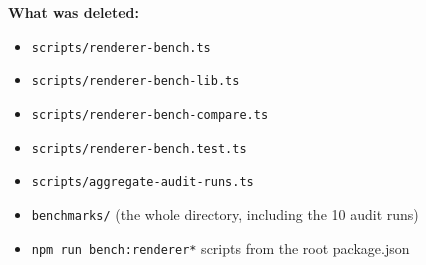 \textbf{What was deleted:}

\begin{itemize}
\tightlist
\item
  \texttt{s\allowbreak{}c\allowbreak{}r\allowbreak{}i\allowbreak{}p\allowbreak{}t\allowbreak{}s\allowbreak{}/\allowbreak{}r\allowbreak{}e\allowbreak{}n\allowbreak{}d\allowbreak{}e\allowbreak{}r\allowbreak{}e\allowbreak{}r\allowbreak{}-\allowbreak{}b\allowbreak{}e\allowbreak{}n\allowbreak{}c\allowbreak{}h\allowbreak{}.\allowbreak{}t\allowbreak{}s}
\item
  \texttt{s\allowbreak{}c\allowbreak{}r\allowbreak{}i\allowbreak{}p\allowbreak{}t\allowbreak{}s\allowbreak{}/\allowbreak{}r\allowbreak{}e\allowbreak{}n\allowbreak{}d\allowbreak{}e\allowbreak{}r\allowbreak{}e\allowbreak{}r\allowbreak{}-\allowbreak{}b\allowbreak{}e\allowbreak{}n\allowbreak{}c\allowbreak{}h\allowbreak{}-\allowbreak{}l\allowbreak{}i\allowbreak{}b\allowbreak{}.\allowbreak{}t\allowbreak{}s}
\item
  \texttt{s\allowbreak{}c\allowbreak{}r\allowbreak{}i\allowbreak{}p\allowbreak{}t\allowbreak{}s\allowbreak{}/\allowbreak{}r\allowbreak{}e\allowbreak{}n\allowbreak{}d\allowbreak{}e\allowbreak{}r\allowbreak{}e\allowbreak{}r\allowbreak{}-\allowbreak{}b\allowbreak{}e\allowbreak{}n\allowbreak{}c\allowbreak{}h\allowbreak{}-\allowbreak{}c\allowbreak{}o\allowbreak{}m\allowbreak{}p\allowbreak{}a\allowbreak{}r\allowbreak{}e\allowbreak{}.\allowbreak{}t\allowbreak{}s}
\item
  \texttt{s\allowbreak{}c\allowbreak{}r\allowbreak{}i\allowbreak{}p\allowbreak{}t\allowbreak{}s\allowbreak{}/\allowbreak{}r\allowbreak{}e\allowbreak{}n\allowbreak{}d\allowbreak{}e\allowbreak{}r\allowbreak{}e\allowbreak{}r\allowbreak{}-\allowbreak{}b\allowbreak{}e\allowbreak{}n\allowbreak{}c\allowbreak{}h\allowbreak{}.\allowbreak{}t\allowbreak{}e\allowbreak{}s\allowbreak{}t\allowbreak{}.\allowbreak{}t\allowbreak{}s}
\item
  \texttt{s\allowbreak{}c\allowbreak{}r\allowbreak{}i\allowbreak{}p\allowbreak{}t\allowbreak{}s\allowbreak{}/\allowbreak{}a\allowbreak{}g\allowbreak{}g\allowbreak{}r\allowbreak{}e\allowbreak{}g\allowbreak{}a\allowbreak{}t\allowbreak{}e\allowbreak{}-\allowbreak{}a\allowbreak{}u\allowbreak{}d\allowbreak{}i\allowbreak{}t\allowbreak{}-\allowbreak{}r\allowbreak{}u\allowbreak{}n\allowbreak{}s\allowbreak{}.\allowbreak{}t\allowbreak{}s}
\item
  \texttt{b\allowbreak{}e\allowbreak{}n\allowbreak{}c\allowbreak{}h\allowbreak{}m\allowbreak{}a\allowbreak{}r\allowbreak{}k\allowbreak{}s\allowbreak{}/} (the whole directory, including the 10 audit runs)
\item
  \texttt{n\allowbreak{}p\allowbreak{}m\allowbreak{} \allowbreak{}r\allowbreak{}u\allowbreak{}n\allowbreak{} \allowbreak{}b\allowbreak{}e\allowbreak{}n\allowbreak{}c\allowbreak{}h\allowbreak{}:\allowbreak{}r\allowbreak{}e\allowbreak{}n\allowbreak{}d\allowbreak{}e\allowbreak{}r\allowbreak{}e\allowbreak{}r\allowbreak{}*} scripts from the root package.json
\end{itemize}

